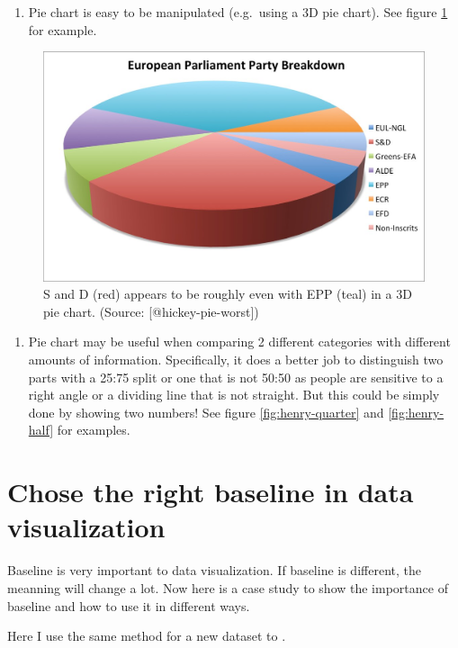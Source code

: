 \documentclass[]{book}
\providecommand{\tightlist}{%
  \setlength{\itemsep}{0pt}\setlength{\parskip}{0pt}}
\theoremstyle{definition}
\theoremstyle{definition}
\theoremstyle{definition}
\theoremstyle{remark}
\begin{document}
\begin{enumerate}
\def\labelenumi{\arabic{enumi}.}
\setcounter{enumi}{2}
\tightlist
\item
  Pie chart is easy to be manipulated (e.g.~using a 3D pie chart). See
  figure \ref{fig:hickey-3D} for example.
\end{enumerate}

\begin{figure}
\includegraphics[width=0.7\linewidth]{images/hickey-3D} \caption{S and D (red) appears to be roughly even with EPP (teal) in a 3D pie chart. (Source: [@hickey-pie-worst])}\label{fig:hickey-3D}
\end{figure}

\begin{enumerate}
\def\labelenumi{\arabic{enumi}.}
\setcounter{enumi}{3}
\tightlist
\item
  Pie chart may be useful when comparing 2 different categories with
  different amounts of information. Specifically, it does a better job
  to distinguish two parts with a 25:75 split or one that is not 50:50
  as people are sensitive to a right angle or a dividing line that is
  not straight. But this could be simply done by showing two numbers!
  See figure \ref{fig:henry-quarter} and \ref{fig:henry-half} for
  examples.
\end{enumerate}

\section{Chose the right baseline in data
visualization}\label{chose-the-right-baseline-in-data-visualization}

Baseline is very important to data visualization. If baseline is
different, the meanning will change a lot. Now here is a case study to
show the importance of baseline and how to use it in different ways.

Here I use the same method for a new dataset to .
\end{document}
